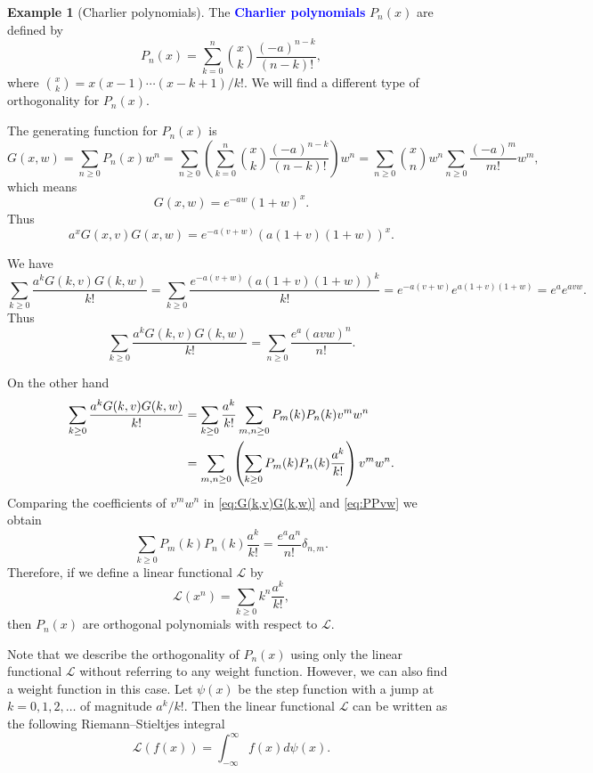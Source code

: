 \documentclass[oneside]{book}
\numberwithin{equation}{section}
\theoremstyle{definition}
\newtheorem{exam}[thm]{Example}
\newcommand\LL{\mathcal{L}}
\renewcommand\emph[1]{\textcolor{blue}{\bf #1}}
\begin{document}
\begin{exam}[Charlier polynomials]
  The \emph{Charlier polynomials} \( P_n(x) \) are defined by
  \[
    P_n(x) = \sum_{k=0}^{n} \binom{x}{k} \frac{(-a)^{n-k}}{(n-k)!},
  \]
  where \( \binom{x}{k} = x(x-1)\cdots(x-k+1)/k! \).
  We will find a different type of orthogonality for \( P_n(x) \).

  The generating function for \( P_n(x) \) is
  \[
    G(x,w) = \sum_{n\ge0} P_n(x) w^n
    = \sum_{n\ge0} \left( \sum_{k=0}^{n} \binom{x}{k} \frac{(-a)^{n-k}}{(n-k)!} \right) w^n
    = \sum_{n\ge0} \binom{x}{n} w^n \sum_{n\ge 0} \frac{(-a)^m}{m!} w^m,
  \]
  which means
  \[
    G(x,w) =  e^{-aw}(1+w)^x .
  \]
  Thus
  \[
    a^x G(x,v) G(x,w) = e^{-a(v+w)} \left( a(1+v)(1+w) \right)^x .
  \]

  We have
  \[
    \sum_{k\ge 0} \frac{a^k G(k,v)G(k,w)}{k!}
    = \sum_{k\ge 0} \frac{e^{-a(v+w)} \left( a(1+v)(1+w) \right)^k}{k!} 
    = e^{-a(v+w)} e^{a(1+v)(1+w)} = e^ae^{avw}.
  \]
  Thus
  \begin{equation}\label{eq:G(k,v)G(k,w)}
    \sum_{k\ge 0} \frac{a^k G(k,v)G(k,w)}{k!}
    = \sum_{n\ge 0} \frac{e^a (avw)^n}{n!}.
  \end{equation}

On the other hand
\begin{align}
  \notag
    \sum_{k\ge 0} \frac{a^k G(k,v)G(k,w)}{k!}
    &= \sum_{k\ge 0} \frac{a^k}{k!} \sum_{m,n\ge0} P_m(k) P_n(k) v^m w^n\\
  \label{eq:PPvw}
    &= \sum_{m,n\ge0} \left( \sum_{k\ge 0}  P_m(k) P_n(k) \frac{a^k}{k!} \right)v^m w^n.
\end{align}
Comparing the coefficients of \( v^mw^n \) in \eqref{eq:G(k,v)G(k,w)} and \eqref{eq:PPvw} we obtain
\begin{equation}\label{eq:charlier-orthogonality}
  \sum_{k\ge 0}  P_m(k) P_n(k) \frac{a^k}{k!} = \frac{e^a a^n}{n!} \delta_{n,m}.
\end{equation}
Therefore, if we define a linear functional \( \LL \) by
\[
 \LL(x^n)  = \sum_{k\ge 0} k^n \frac{a^k}{k!},
\]
then \( P_n(x) \) are orthogonal polynomials with respect to \( \LL \).

Note that we describe the orthogonality of \( P_n(x) \) using only the
linear functional \( \LL \) without referring to any weight function.
However, we can also find a weight function in this case. Let
\( \psi(x) \) be the step function with a jump at \( k=0,1,2,\ldots \) of
magnitude \( a^k/k! \).
Then the linear functional \( \LL \) can be written as the following
Riemann--Stieltjes integral
\[
  \LL(f(x)) = \int_{-\infty}^\infty f(x) d \psi(x).
\]
\end{exam}
\end{document}
